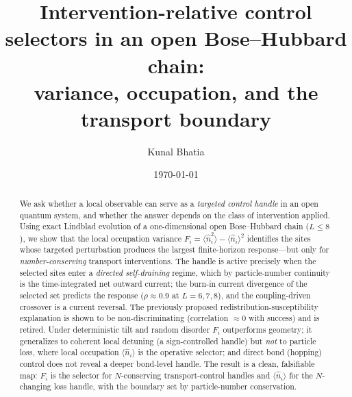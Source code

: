 \documentclass[aps,pra,reprint,amsmath,amssymb,longbibliography,floatfix]{revtex4-2}
\newcommand{\Fi}{F_i}
\newcommand{\nop}{\hat{n}}
\newcommand{\nexp}{\langle\nop_i\rangle}
\begin{document}
\title{Intervention-relative control selectors in an open Bose--Hubbard chain:\\
variance, occupation, and the transport boundary}

\author{Kunal Bhatia}
\date{\today}

\begin{abstract}
We ask whether a local observable can serve as a \emph{targeted control handle} in an open
quantum system, and whether the answer depends on the class of intervention applied. Using exact
Lindblad evolution of a one-dimensional open Bose--Hubbard chain ($L\le8$), we show that the local
occupation variance $\Fi=\langle\nop_i^2\rangle-\nexp^2$ identifies the sites whose targeted
perturbation produces the largest finite-horizon response---but only for \emph{number-conserving}
transport interventions. The handle is active precisely when the selected sites enter a
\emph{directed self-draining} regime, which by particle-number continuity is the time-integrated
net outward current; the burn-in current divergence of the selected set predicts the response
($\rho\approx0.9$ at $L=6,7,8$), and the coupling-driven crossover is a current reversal. The
previously proposed redistribution-susceptibility explanation is shown to be non-discriminating
(correlation $\approx0$ with success) and is retired. Under deterministic tilt and random disorder
$\Fi$ outperforms geometry; it generalizes to coherent local detuning (a sign-controlled handle)
but \emph{not} to particle loss, where local occupation $\nexp$ is the operative selector; and
direct bond (hopping) control does not reveal a deeper bond-level handle. The result is a clean,
falsifiable map: $\Fi$ is the selector for $N$-conserving transport-control handles and $\nexp$
for the $N$-changing loss handle, with the boundary set by particle-number conservation.
\end{abstract}

\maketitle
\end{document}
